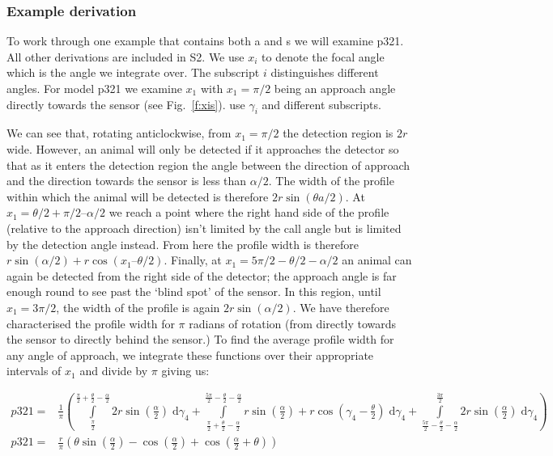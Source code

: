 \documentclass[a4paper,10pt,reqno,oneside]{amsart}
\begin{document}
\subsubsection{Example derivation}

To work through one example that contains both a and s we will examine p321. All other derivations are included in S2. We use $x_i$ to denote the focal angle which is the angle we integrate over. The subscript $i$ distinguishes different angles. For model p321 we examine $x_1$ with  $x_1 = \pi/2$ being an approach angle directly towards the sensor (see Fig.~\ref{f:xis}). \cite{rowcliffe2008estimating} use $\gamma_i$ and different subscripts.

We can see that, rotating anticlockwise, from $x_1  = \pi/2$ the detection region is $2r$ wide. However, an animal will only be detected if it approaches the detector so that as it enters the detection region the angle between the direction of approach and the direction towards the sensor is less than $\alpha/2$. The width of the profile within which the animal will be detected is therefore $2r\sin(θa/2)$. At $x_1  = \theta/2 + \pi/2 – \alpha/2$ we reach a point where the right hand side of the profile (relative to the approach direction) isn't limited by the call angle but is limited by the detection angle instead. From here the profile width is therefore $r\sin( \alpha/2) + r\cos( x_1  – \theta/2)$. Finally, at $x_1  = 5\pi/2 - \theta/2  - \alpha/2$ an animal can again be detected from the right side of the detector; the approach angle is far enough round to see past the `blind spot' of the sensor. In this region, until $x_1  = 3\pi/2$, the width of the profile is again $2r\sin( \alpha/2)$. We have therefore characterised the profile width for $\pi$ radians of rotation (from directly towards the sensor to directly behind the sensor.) To find the average profile width for any angle of approach, we integrate these functions over their appropriate intervals of $x_1 $ and divide by $\pi$ giving us:

\begin{align}
    p321 =&\frac{1}{\pi} \left(\int\limits_{\frac{\pi}{2}}^{\frac{\pi}{2} + \frac{\theta}{2} - \frac{\alpha}{2}}2 r \sin{\left (\frac{\alpha}{2} \right )}\;\mathrm{d}\gamma_{4}+\int\limits_{\frac{\pi}{2} + \frac{\theta}{2} - \frac{\alpha}{2}}^{\frac{5 \pi}{2} - \frac{\theta}{2} - \frac{\alpha}{2}}r \sin{\left (\frac{\alpha}{2} \right )} + r \cos{\left (\gamma_{4} - \frac{\theta}{2} \right )}\;\mathrm{d}\gamma_{4}+\int\limits_{\frac{5 \pi}{2} - \frac{\theta}{2} - \frac{\alpha}{2}}^{\frac{3 \pi}{2}}2 r \sin{\left (\frac{\alpha}{2} \right )}\;\mathrm{d}\gamma_{4}\right)\\
    p321 =& \frac{r}{\pi} \left(\theta \sin{\left (\frac{\alpha}{2} \right )} - \cos{\left (\frac{\alpha}{2} \right )} + \cos{\left (\frac{\alpha}{2} + \theta \right )}\right)
\end{align}
\end{document}
